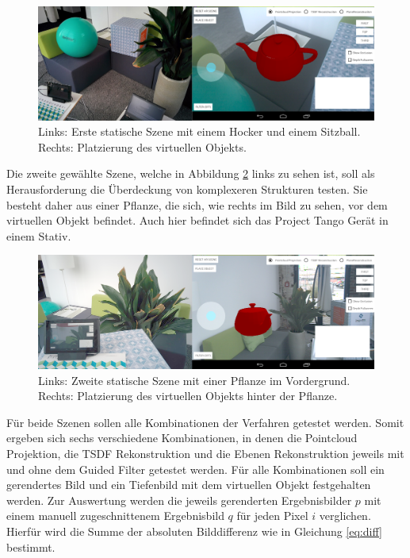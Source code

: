\begin{figure}[h]
  \centering
	\includegraphics[width=1.0\textwidth]{content/images/evaluation/static-scene.png} 
  \caption{Links: Erste statische Szene mit einem Hocker und einem Sitzball. Rechts: Platzierung des virtuellen Objekts. }
  \label{fig:static-scene}
\end{figure}

Die zweite gewählte Szene, welche in Abbildung \ref{fig:plant-scene} links zu sehen ist, soll als Herausforderung die Überdeckung von komplexeren Strukturen testen. Sie besteht daher aus einer Pflanze, die sich, wie rechts im Bild zu sehen, vor dem virtuellen Objekt befindet. Auch hier befindet sich das Project Tango Gerät in einem Stativ.

\begin{figure}[h]
  \centering
	\includegraphics[width=1.0\textwidth]{content/images/evaluation/plant-scene.png} 
  \caption{Links: Zweite statische Szene mit einer Pflanze im Vordergrund. Rechts: Platzierung des virtuellen Objekts hinter der Pflanze. }
  \label{fig:plant-scene}
\end{figure}

Für beide Szenen sollen alle Kombinationen der Verfahren getestet werden. Somit ergeben sich sechs verschiedene Kombinationen, in denen die Pointcloud Projektion, die TSDF Rekonstruktion und die Ebenen Rekonstruktion jeweils mit und ohne dem Guided Filter getestet werden. Für alle Kombinationen soll ein gerendertes Bild und ein Tiefenbild mit dem virtuellen Objekt festgehalten werden. Zur Auswertung werden die jeweils gerenderten Ergebnisbilder \(p\) mit einem manuell zugeschnittenem Ergebnisbild  \(q\) für jeden Pixel \(i\) verglichen. Hierfür wird die Summe der absoluten Bilddifferenz wie in Gleichung \ref{eq:diff} bestimmt.

